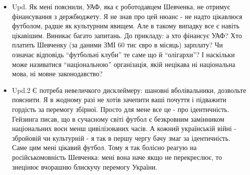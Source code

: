 \begin{itemize}
\item Upd. Як мені пояснили, УАФ, яка є роботодавцем Шевченка, не отримує
фінансування з держбюджету. Я не знав про цей нюанс - не надто цікавлюся
футболом, радше як культурним явищем. Але в такому випадку все є навіть
цікавішим. Виникає багато запитань. До прикладу: а хто фінансує УАФ? Хто
платить Шевченку (за даними ЗМІ 60 тис євро в місяць) зарплату? Чи означає
відповідь \enquote{футбольні клуби} те саме що й \enquote{олігархи}? І наскільки може
називатися \enquote{національною} організація, якій нецікава ні національна мова, ні
мовне законодавство?

\item Upd.2 Є потреба невеличкого дисклеймеру: шановні вболівальники, дозвольте
пояснити. Я  в жодному разі не хотів зачепити ваші почуття і підважити гордість
за перемогу збірної. Просто для мене все це - про ідентичність. Гейзинга писав,
що в сучасному світі футбол є безкровним замінником національних воєн менш
цивілізованих часів. А кожний українській війні - збройовій чи культурній -  я
так в першу чергу бачу змаг за ідентичність. Саме цим мені цікавий футбол. Тому
я так болісно реагую на російськомовність Шевченка: мені вона наче якщо не
перекреслює, то знецінює вчорашню блискучу перемогу України.

\end{itemize}

